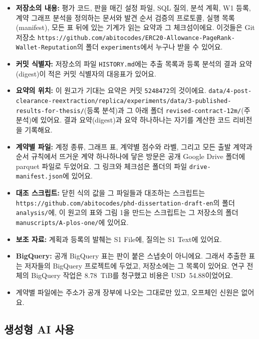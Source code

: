 \begin{itemize}
\item \textbf{저장소의 내용:} 평가 코드, 판을 매긴 설정 파일, SQL 질의, 분석 계획, W1 등록, 계약 그래프 분석을 정의하는 문서와 발견 순서 검증의 프로토콜, 실행 목록(manifest), 모든 표 뒤에 있는 기계가 읽는 요약과 그 체크섬이에요. 이것들은 Git 저장소 \nolinkurl{https://github.com/abitocodes/ERC20-Allowance-PageRank-Wallet-Reputation}의 폴더 \nolinkurl{experiments}에서 누구나 받을 수 있어요.
\item \textbf{커밋 식별자:} 저장소의 파일 \nolinkurl{HISTORY.md}에는 추출 목록과 등록 분석의 결과 요약(digest)이 적은 커밋 식별자의 대응표가 있어요.
\item \textbf{요약의 위치:} 이 원고가 기대는 요약은 커밋 \texttt{5248472}의 것이에요. \nolinkurl{data/4-post-clearance-reextraction/replica/experiments/data/3-published-results-for-thesis/}(등록 분석)과 그 아래 폴더 \nolinkurl{revised-contract-12m/}(주 분석)에 있어요. 결과 요약(digest)과 요약 하나하나는 자기를 계산한 코드 리비전을 기록해요.
\item \textbf{계약별 파일:} 계정 종류, 그래프 표, 계약별 점수와 라벨, 그리고 모든 출발 계약과 순서 규칙에서 뜨거운 계약 하나하나에 닿은 방문은 공개 Google Drive 폴더에 parquet 파일로 두었어요. 그 링크와 체크섬은 폴더의 파일 \nolinkurl{drive-manifest.json}에 있어요.
\item \textbf{대조 스크립트:} 닫힌 식의 값을 그 파일들과 대조하는 스크립트는 \nolinkurl{https://github.com/abitocodes/phd-dissertation-draft-en}의 폴더 \nolinkurl{analysis/}에, 이 원고의 표와 그림 1을 만드는 스크립트는 그 저장소의 폴더 \nolinkurl{manuscripts/A-plos-one/}에 있어요.
\item \textbf{보조 자료:} 계획과 등록의 발췌는 S1 File에, 질의는 S1 Text에 있어요.
\item \textbf{BigQuery:} 공개 BigQuery 표는 판이 붙은 스냅숏이 아니에요. 그래서 추출한 표는 저자들의 BigQuery 프로젝트에 두었고, 저장소에는 그 목록이 있어요. 연구 전체의 BigQuery 작업은 8.78~TiB를 청구했고 비용은 USD~54.88이었어요.
\item 계약별 파일에는 주소가 공개 장부에 나오는 그대로만 있고, 오프체인 신원은 없어요.
\end{itemize}

\subsection{생성형 AI 사용}

